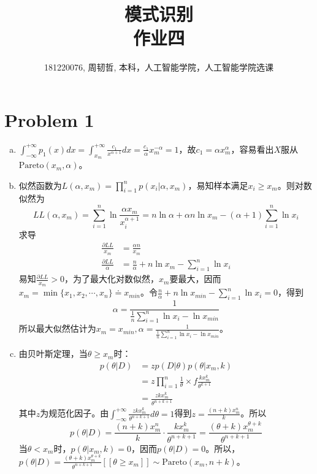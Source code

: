 \documentclass[a4paper,UTF8]{article}
\numberwithin{equation}{section}
\begin{document}
\title{模式识别\\
作业四}
\author{181220076, 周韧哲, 本科，人工智能学院，人工智能学院选课}
\maketitle

\section*{Problem 1}
\begin{enumerate}[(a)]
	\item 
	    $\int_{-\infty}^{+\infty}p_1(x)dx=\int_{x_m}^{+\infty}\frac{c_1}{x^{\alpha+1}}dx=\frac{c_1}{\alpha}x_m^{-\alpha}=1$，故$c_1=\alpha x_m^\alpha$，容易看出$X$服从$\text{Pareto}(x_m,\alpha)$。
	\item 似然函数为$L(\alpha,x_m)=\prod_{i=1}^np(x_i|\alpha,x_m)$，易知样本满足$x_i\geq x_m$。则对数似然为$$LL(\alpha,x_m)=\sum_{i=1}^n\ln\frac{\alpha x_m}{x_i^{\alpha+1}}=n\ln\alpha+\alpha n\ln x_m-(\alpha+1)\sum_{i=1}^n\ln x_i$$
	求导
	\begin{align*}
	    \frac{\partial LL}{x_m}&=\frac{\alpha n}{x_m}\\
	    \frac{\partial LL}{\alpha}&=\frac{n}{\alpha} + n\ln x_m -\sum_{i=1}^n\ln x_i
	\end{align*}
	易知$\frac{\partial LL}{x_m}>0$，为了最大化对数似然，$x_m$要最大，因而$x_m=\min\{x_1,x_2,\cdots,x_n\}\doteq x_{min}$。令$\frac{n}{\alpha} + n\ln x_{min} -\sum_{i=1}^n\ln x_i=0$，得到$$\alpha=\frac{1}{\frac{1}{n}\sum_{i=1}^n\ln x_i - \ln x_{min}}$$
	所以最大似然估计为$x_m=x_{min},\alpha=\frac{1}{\frac{1}{n}\sum_{i=1}^n\ln x_i - \ln x_{min}}$。
	\item 由贝叶斯定理，当$\theta\geq x_m$时：
	\begin{align*}
	    p(\theta|D)&=zp(D|\theta)p(\theta|x_m,k)\\
	    &=z\prod_{i=1}^n\frac{1}{\theta}\times f\frac{kx_m^k}{\theta^{k+1}}\\
	    &=\frac{zkx_m^k}{\theta^{n+k+1}}
	\end{align*}
	其中$z$为规范化因子。由$\int_{-\infty}^{+\infty}\frac{zkx_m^k}{\theta^{n+k+1}}d\theta=1$得到$z=\frac{(n+k)x_m^n}{k}$。所以
	$$p(\theta|D)=\frac{(n+k)x_m^n}{k}\cdot\frac{kx_m^k}{\theta^{n+k+1}}=\frac{(\theta+k)x_m^{\theta+k}}{\theta^{n+k+1}}$$
	当$\theta<x_m$时，$p(\theta|x_m,k)=0$，因而$p(\theta|D)=0$。所以，$p(\theta|D)=\frac{(\theta+k)x_m^{\theta+k}}{\theta^{n+k+1}}[\![\theta\geq x_m]\!]\sim\text{Pareto}(x_m,n+k)$。
\end{enumerate}
\end{document}

